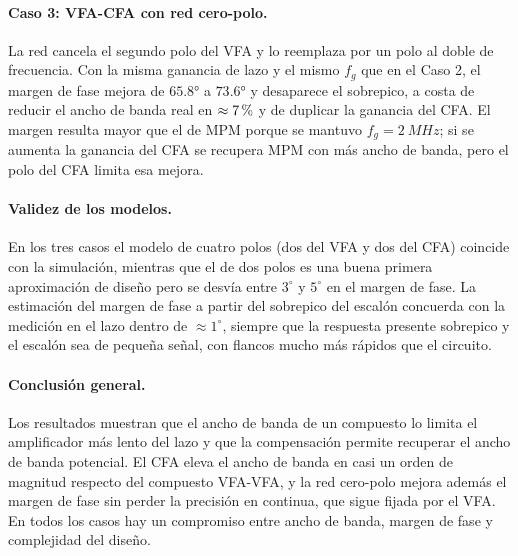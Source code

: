 \paragraph{Caso 3: VFA-CFA con red cero-polo.} La red cancela el segundo polo del VFA y lo reemplaza por un polo al doble de frecuencia. Con la misma ganancia de lazo y el mismo $f_g$ que en el Caso 2, el margen de fase mejora de $\ang{65,8}$ a $\ang{73,6}$ y desaparece el sobrepico, a costa de reducir el ancho de banda real en $\approx7\,\mathrm{\char37}$ y de duplicar la ganancia del CFA. El margen resulta mayor que el de MPM porque se mantuvo $f_g = \SI{2}{MHz}$; si se aumenta la ganancia del CFA se recupera MPM con más ancho de banda, pero el polo del CFA limita esa mejora.

\paragraph{Validez de los modelos.} En los tres casos el modelo de cuatro polos (dos del VFA y dos del CFA) coincide con la simulación, mientras que el de dos polos es una buena primera aproximación de diseño pero se desvía entre $3^\circ$ y $5^\circ$ en el margen de fase. La estimación del margen de fase a partir del sobrepico del escalón concuerda con la medición en el lazo dentro de $\approx1^\circ$, siempre que la respuesta presente sobrepico y el escalón sea de pequeña señal, con flancos mucho más rápidos que el circuito.

\paragraph{Conclusión general.} Los resultados muestran que el ancho de banda de un compuesto lo limita el amplificador más lento del lazo y que la compensación permite recuperar el ancho de banda potencial. El CFA eleva el ancho de banda en casi un orden de magnitud respecto del compuesto VFA-VFA, y la red cero-polo mejora además el margen de fase sin perder la precisión en continua, que sigue fijada por el VFA. En todos los casos hay un compromiso entre ancho de banda, margen de fase y complejidad del diseño.
